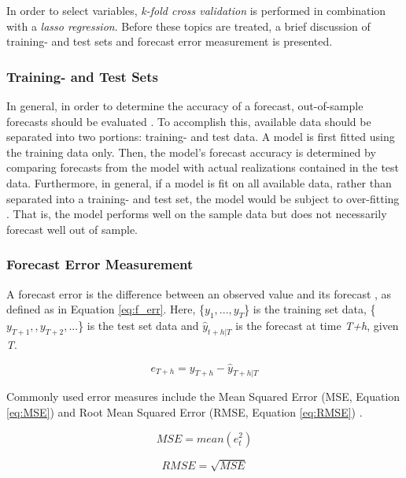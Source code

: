 In order to select variables, \textit{k-fold cross validation} is performed in combination with a \textit{lasso regression}. Before these topics are treated, a brief discussion of training- and test sets and forecast error measurement is presented.


\subsubsection{Training- and Test Sets}
In general, in order to determine the accuracy of a forecast, out-of-sample forecasts should be evaluated \citep{Hyndman}. To accomplish this, available data should be separated into two portions: training- and test data. A model is first fitted using the training data only. Then, the model's forecast accuracy is determined by comparing forecasts from the model with actual realizations contained in the test data. Furthermore, in general, if a model is fit on all available data, rather than separated into a training- and test set, the model would be subject to over-fitting \citep{Hyndman}. That is, the model performs well on the sample data but does not necessarily forecast well out of sample.

\subsubsection{Forecast Error Measurement}
A forecast error is the difference between an observed value and its forecast \citep{Hyndman}, as defined as in Equation \ref{eq:f_err}. Here, \{$ y_{1},...,y_{T} $\} is the training set data, \{$ y_{T+1},,y_{T+2},...$\} is the test set data and $\hat{y}_{t+h|T}$ is the forecast at time \textit{T+h}, given \textit{T}. 

\begin{equation}\label{eq:f_err}
    e_{T+h} = y_{T+h} - \hat{y}_{T+h|T}
\end{equation}

Commonly used error measures include the Mean Squared Error (MSE, Equation \ref{eq:MSE}) and Root Mean Squared Error (RMSE, Equation \ref{eq:RMSE}) \citep{Hyndman}.

\begin{equation}\label{eq:MSE}
    MSE = mean(e_t^2)
\end{equation}

\begin{equation}\label{eq:RMSE}
    RMSE = \sqrt{MSE}
\end{equation}


